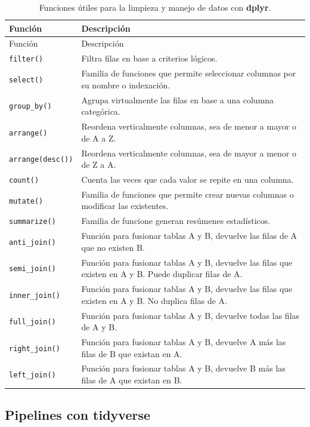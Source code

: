 \documentclass[
]{article}
\theoremstyle{definition}
\theoremstyle{definition}
\theoremstyle{definition}
\theoremstyle{definition}
\theoremstyle{remark}
\begin{document}
\begin{longtable}[]{@{}ll@{}}
\caption{\label{tab:unnamed-chunk-7}Funciones útiles para la limpieza y manejo de datos con \textbf{dplyr}.}\tabularnewline
\toprule()
Función & Descripción \\
\midrule()
\endfirsthead
\toprule()
Función & Descripción \\
\midrule()
\endhead
\texttt{filter()} & Filtra filas en base a criterios lógicos. \\
\texttt{select()} & Familia de funciones que permite seleccionar columnas por su nombre o indexación. \\
\texttt{group\_by()} & Agrupa virtualmente las filas en base a una columna categórica. \\
\texttt{arrange()} & Reordena verticalmente columnas, sea de menor a mayor o de A a Z. \\
\texttt{arrange(desc())} & Reordena verticalmente columnas, sea de mayor a menor o de Z a A. \\
\texttt{count()} & Cuenta las veces que cada valor se repite en una columna. \\
\texttt{mutate()} & Familia de funciones que permite crear nuevas columnas o modificar las existentes. \\
\texttt{summarize()} & Familia de funcione generan resúmenes estadísticos. \\
\texttt{anti\_join()} & Función para fusionar tablas A y B, devuelve las filas de A que no existen B. \\
\texttt{semi\_join()} & Función para fusionar tablas A y B, devuelve las filas que existen en A y B. Puede duplicar filas de A. \\
\texttt{inner\_join()} & Función para fusionar tablas A y B, devuelve las filas que existen en A y B. No duplica filas de A. \\
\texttt{full\_join()} & Función para fusionar tablas A y B, devuelve todas las filas de A y B. \\
\texttt{right\_join()} & Función para fusionar tablas A y B, devuelve A más las filas de B que existan en A. \\
\texttt{left\_join()} & Función para fusionar tablas A y B, devuelve B más las filas de A que existan en B. \\
\bottomrule()
\end{longtable}

\hypertarget{pipelines-con-tidyverse}{%
\subsection{Pipelines con tidyverse}\label{pipelines-con-tidyverse}}
\end{document}
